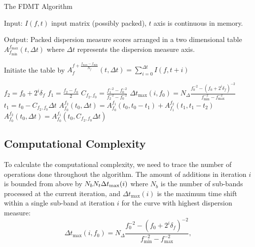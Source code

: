 \documentclass[iop]{emulateapj}
\begin{document}
\begin{algorithm}[H]
\caption{The FDMT Algorithm}
\label{FDMT}
Input: $I(f,t)$ input matrix (possibly packed), $t$ axis is continuous in memory.

Output: Packed dispersion measure scores arranged in a two dimensional table  $A_{f_{\min}}^{f_{\max}}(t,\Delta t)$ where $\Delta t$ represents the dispersion measure axis.
\begin{algorithmic}
  \STATE Initiate the table by  $ A_{f}^{f + \frac{f_{\max} - f_{\min}}{N_f}}(t,\Delta t) = \sum_{i=0}^{\Delta t}{I(f,t+i)}$
  
   
  \STATE $f_2 = f_0 + 2^i\delta_f$
  \STATE $f_1 = \frac{f_2 - f_0}{2}$
  \STATE $C_{f_2,f_0} = \frac{f_1^{-2} - f_0^{-2}}{f_2^{-2} - f_0^{-2}}$
  \STATE $\Delta t_{\max}(i,f_0) = N_\Delta \frac{f_0^{-2} - (f_0 + 2^i\delta_f)^{-2}} {f_{\min}^{-2} - f_{\max}^{-2}} $
  \STATE $t_1 = t_0 - C_{f_2,f_0}\Delta t$
  \STATE
  $
  A_{f_0}^{f_2}(t_0,\Delta t) = A_{f_0}^{f_1}(t_0,t_0-t_1) + A_{f_1}^{f_2}(t_1,t_1-t_2)
  $
  \ENDFOR
    \STATE
    $
    A_{f_0}^{f_2}(t_0,\Delta t) = A_{f_0}^{f_1}(t_0,C_{f_2,f_0} \Delta t)
    $
    \ENDFOR
    
  
  \ENDFOR
  \ENDFOR 
  \ENDFOR
  
\end{algorithmic}
\end{algorithm}

\subsection{Computational Complexity}
To calculate the computational complexity, we need to trace the number of operations done throughout the algorithm.
The amount of additions in iteration $i$ is bounded from above by $N_bN_t\Delta t_{\rm max}(i)$ where $N_b$ is the number of sub-bands processed at the current iteration, and $\Delta t_{\max}(i)$ is the maximum time shift within a single sub-band at iteration $i$ for the curve with highest dispersion measure:
\begin{equation}
\Delta t_{\max}(i,f_0) = N_\Delta \frac{f_0^{-2} - (f_0 + 2^i\delta_f)^{-2}} {f_{\min}^{-2} - f_{\max}^{-2}},
\end{equation}
\end{document}

